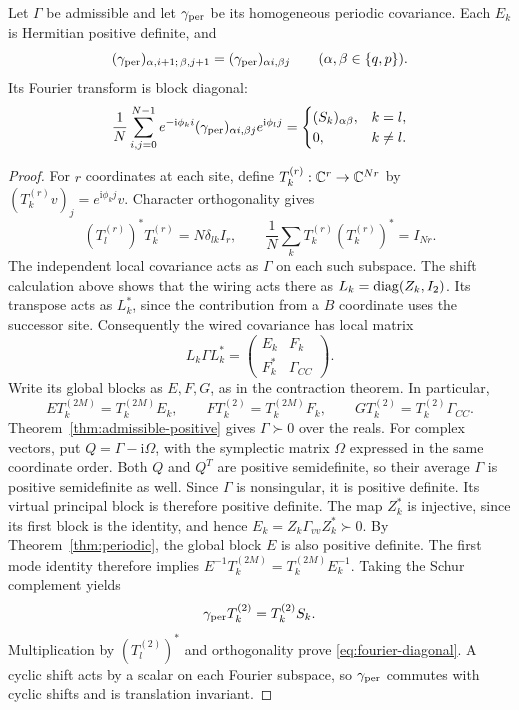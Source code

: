 \begin{theorem}\label{thm:fourier-contraction}
Let $\Gamma$ be admissible and let $\gamma_{\rm per}$ be its homogeneous
periodic covariance. Each $E_k$ is Hermitian positive definite, and
\[
 (\gamma_{\rm per})_{\alpha,i+1;\,\beta,j+1}
   =(\gamma_{\rm per})_{\alpha i,\beta j}
 \qquad(\alpha,\beta\in\{q,p\}).
\]
Its Fourier transform is block diagonal:
\begin{equation}\label{eq:fourier-diagonal}
 \frac1N\sum_{i,j=0}^{N-1}e^{-\mathrm i\phi_ki}
 (\gamma_{\rm per})_{\alpha i,\beta j}e^{\mathrm i\phi_lj}
 =\begin{cases}(S_k)_{\alpha\beta},&k=l,\\0,&k\ne l.\end{cases}
\end{equation}
\end{theorem}
\begin{proof}
For $r$ coordinates at each site, define $T_k^{(r)}:\mathbb C^r\to\mathbb C^{Nr}$ by
$(T_k^{(r)}v)_j=e^{\mathrm i\phi_kj}v$. Character orthogonality gives
\[
 (T_l^{(r)})^*T_k^{(r)}=N\delta_{lk}I_r,\qquad
 \frac1N\sum_kT_k^{(r)}(T_k^{(r)})^*=I_{Nr}.
\]
The independent local covariance acts as $\Gamma$ on each such subspace.
The shift calculation above shows that the wiring acts there as
$L_k=\operatorname{diag}(Z_k,I_2)$. Its transpose acts as $L_k^*$, since the contribution
from a $B$ coordinate uses the successor site. Consequently the wired
covariance has local matrix
\[
 L_k\Gamma L_k^*=\begin{pmatrix}E_k&F_k\\F_k^*&\Gamma_{CC}\end{pmatrix}.
\]
Write its global blocks as $E,F,G$, as in the contraction theorem. In particular,
\[
 ET_k^{(2M)}=T_k^{(2M)}E_k,\qquad
 FT_k^{(2)}=T_k^{(2M)}F_k,\qquad
 GT_k^{(2)}=T_k^{(2)}\Gamma_{CC}.
\]
Theorem~\ref{thm:admissible-positive} gives $\Gamma\succ0$ over the reals.
For complex vectors, put $Q=\Gamma-\mathrm i\Omega$, with the symplectic
matrix $\Omega$ expressed in the same coordinate order. Both $Q$ and
$Q^T$ are positive semidefinite, so their average $\Gamma$ is positive
semidefinite as well. Since $\Gamma$ is nonsingular, it is positive definite.
Its virtual principal block is therefore positive definite. The map $Z_k^*$
is injective, since its first block is the identity, and hence
$E_k=Z_k\Gamma_{vv}Z_k^*\succ0$.
By Theorem~\ref{thm:periodic}, the global block $E$ is also positive definite.
The first mode identity therefore implies
$E^{-1}T_k^{(2M)}=T_k^{(2M)}E_k^{-1}$.
Taking the Schur complement yields
\[
 \gamma_{\rm per}T_k^{(2)}=T_k^{(2)}S_k.
\]
Multiplication by $(T_l^{(2)})^*$ and orthogonality prove
\eqref{eq:fourier-diagonal}. A cyclic shift acts by a scalar on each Fourier
subspace, so $\gamma_{\rm per}$ commutes with cyclic shifts and is
translation invariant.
\end{proof}

